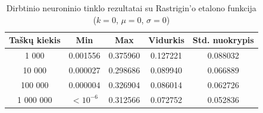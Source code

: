 \begin{table}[H]
    \centering
    \begin{tabular}{|c|c|c|c|c|}
        \hline
        \textbf{Taškų kiekis} & \textbf{Min} & \textbf{Max} & \textbf{Vidurkis} & \textbf{Std. nuokrypis} \\ \hline
        1 000        & 0.001556 & 0.375960 & 0.127221 & 0.088032 \\ \hline
        10 000       & 0.000027 & 0.298686 & 0.089940 & 0.066889 \\ \hline
        100 000      & 0.000004 & 0.326904 & 0.086014 & 0.062726 \\ \hline
        1 000 000    & $<10^{-6}$ & 0.312566 & 0.072752 & 0.052836 \\ \hline
    \end{tabular}
    \caption{Dirbtinio neuroninio tinklo rezultatai su Rastrigin'o etalono funkcija ($k = 0$, $\mu = 0$, $\sigma = 0$)}
\end{table}
